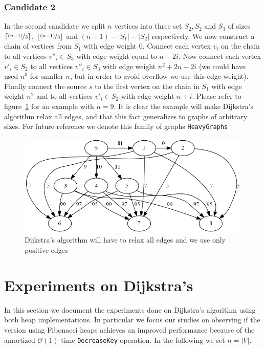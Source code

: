\documentclass[a4paper,oneside,article,11pt]{memoir}
\begin{document}
\subsection{Candidate 2}
In the second candidate we split $n$ vertices into three set $S_2, S_2$ and $S_3$ of sizes $\lceil \nicefrac{(n-1)}{3} \rceil$, $\lfloor \nicefrac{(n-1)}{3} \rfloor$ and $(n-1) - \lvert S_1 \rvert - \lvert S_2 \rvert$ respectively. We now construct a chain of vertices from $S_1$ with edge weight $0$. Connect each vertex $v_i$ on the chain to all vertices ${v''}_i \in S_3$ with edge weight equal to $n-2i$. Now connect each vertex ${v'}_i \in S_2$ to all vertices ${v''}_i \in S_3$ with edge weight $n^2 + 2n - 2i$ (we could have used $n^3$ for smaller $n$, but in order to avoid overflow we use this edge weight). Finally connect the source $s$ to the first vertex on the chain in $S_1$ with edge weight $n^2$ and to all vertices ${v'}_i \in S_2$ with edge weight $n+i$. Please refer to figure~\ref{figure:graph_pos_weights} for an example with $n=9$.  It is clear the example will make Dijkstra's algorithm relax all edges, and that this fact generalizes to graphs of arbitrary sizes. For future reference we denote this family of graphs \texttt{HeavyGraphs}

\begin{figure}[H]
\centering
\centerline {
\includegraphics[scale=0.65]{../figures/graph_positive_weights.png}
}
\caption{Dijkstra's algorithm will have to relax all edges and we use only positive edges}
\label{figure:graph_pos_weights}
\end{figure}

\chapter{Experiments on Dijkstra's}
In this section we document the experiments done on Dijkstra's algorithm using both heap implementations. In particular we focus our studies on observing if the version using Fibonacci heaps achieves an improved performance because of the amortized $\mathcal{O}(1)$ time \texttt{DecreaseKey} operation. In the following we set $n = \lvert V \lvert$.
\end{document}
